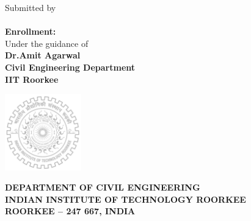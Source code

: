 \begin{titlepage}
	
	\begin{center}
	\fontsize{15pt}{15pt} \selectfont {A \\ Seminar report \\ On}
	
	\fontsize{20pt}{20pt} \selectfont \textbf{\topic}
	\vspace*{1.4cm}
	
	
	
	\vspace*{0.8cm}
	Submitted by\\
		\textbf{\name}\\
	\textbf{Enrollment: \rollno}\\
	\vspace*{1.3cm}
	 Under the guidance of\textbf{\\ Dr.Amit Agarwal \\ Civil Engineering Department\\ IIT Roorkee}
	
	\vspace*{1.6cm}
	\includegraphics[width=1.3in]{IITR_new_logo_gray.png}
	
	\vspace*{1.0cm}
	\fontsize{12pt}{1cm}\selectfont \textbf{DEPARTMENT OF CIVIL ENGINEERING}\\
	\vspace*{0.5cm}
	\fontsize{12pt}{12pt}\selectfont \textbf{INDIAN INSTITUTE OF TECHNOLOGY ROORKEE}\\
	\vspace*{0.5cm}
	\fontsize{12pt}{12pt}\selectfont \textbf{ROORKEE – 247 667, INDIA}\\
\end{center}
\end{titlepage}
